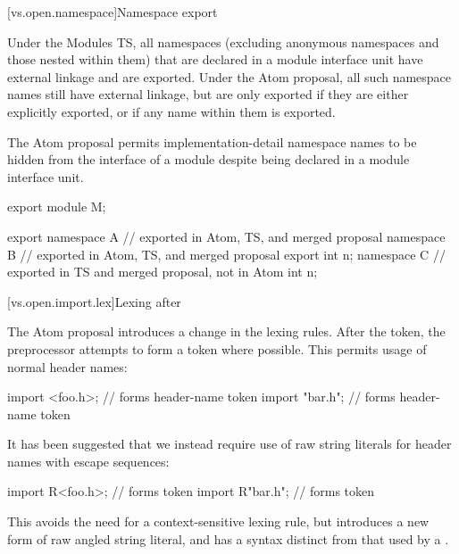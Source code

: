 [vs.open.namespace]{Namespace export}

\pnum
Under the Modules TS,
all namespaces
(excluding anonymous namespaces and those nested within them)
that are declared in a module interface unit
have external linkage and
are exported.
Under the Atom proposal,
all such namespace names
still have external linkage,
but are only exported if they are either
explicitly exported, or
if any name within them is exported.
\begin{note}
The Atom proposal permits implementation-detail namespace names
to be hidden from the interface of a module
despite being declared in a module interface unit.
\end{note}

\pnum
\begin{example}
\begin{codeblock}
export module M;

export namespace A {} // exported in Atom, TS, and merged proposal
namespace B {         // exported in Atom, TS, and merged proposal
  export int n;
}
namespace C {         // exported in TS and merged proposal, not in Atom
  int n;
}
\end{codeblock}
\end{example}

[vs.open.import.lex]{Lexing after }

\pnum
The Atom proposal introduces a change in the \Cpp{} lexing rules.
After the  token,
the preprocessor attempts to form a 
token where possible.
This permits usage of normal header names:

\begin{codeblock}
import <foo.h>;       // forms  header-name token
import "bar\baz.h";   // forms  header-name token
\end{codeblock}

\pnum
It has been suggested that we instead require use of
raw string literals for header names with escape sequences:

\begin{codeblock}
import R<foo.h>;       // forms  token
import R"bar\baz.h";   // forms  token
\end{codeblock}

This avoids the need for a context-sensitive lexing rule,
but introduces a new form of raw angled string literal,
and has a  syntax distinct from
that used by a .

